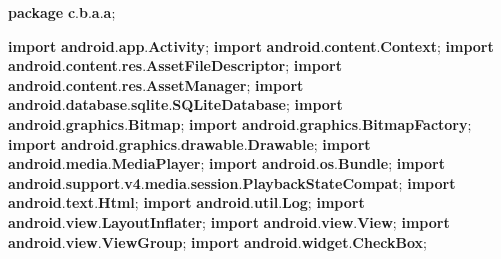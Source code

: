 \documentclass[
]{article}
\newenvironment{Shaded}{}{}
\newcommand{\ImportTok}[1]{\textcolor[rgb]{0.00,0.50,0.00}{\textbf{#1}}}
\newcommand{\KeywordTok}[1]{\textcolor[rgb]{0.00,0.44,0.13}{\textbf{#1}}}
\newcommand{\OperatorTok}[1]{\textcolor[rgb]{0.40,0.40,0.40}{#1}}
\begin{document}
\begin{Shaded}
\begin{Highlighting}[]
\KeywordTok{package}\ImportTok{ c}\OperatorTok{.}\ImportTok{b}\OperatorTok{.}\ImportTok{a}\OperatorTok{.}\ImportTok{a}\OperatorTok{;}

\KeywordTok{import} \ImportTok{android}\OperatorTok{.}\ImportTok{app}\OperatorTok{.}\ImportTok{Activity}\OperatorTok{;}
\KeywordTok{import} \ImportTok{android}\OperatorTok{.}\ImportTok{content}\OperatorTok{.}\ImportTok{Context}\OperatorTok{;}
\KeywordTok{import} \ImportTok{android}\OperatorTok{.}\ImportTok{content}\OperatorTok{.}\ImportTok{res}\OperatorTok{.}\ImportTok{AssetFileDescriptor}\OperatorTok{;}
\KeywordTok{import} \ImportTok{android}\OperatorTok{.}\ImportTok{content}\OperatorTok{.}\ImportTok{res}\OperatorTok{.}\ImportTok{AssetManager}\OperatorTok{;}
\KeywordTok{import} \ImportTok{android}\OperatorTok{.}\ImportTok{database}\OperatorTok{.}\ImportTok{sqlite}\OperatorTok{.}\ImportTok{SQLiteDatabase}\OperatorTok{;}
\KeywordTok{import} \ImportTok{android}\OperatorTok{.}\ImportTok{graphics}\OperatorTok{.}\ImportTok{Bitmap}\OperatorTok{;}
\KeywordTok{import} \ImportTok{android}\OperatorTok{.}\ImportTok{graphics}\OperatorTok{.}\ImportTok{BitmapFactory}\OperatorTok{;}
\KeywordTok{import} \ImportTok{android}\OperatorTok{.}\ImportTok{graphics}\OperatorTok{.}\ImportTok{drawable}\OperatorTok{.}\ImportTok{Drawable}\OperatorTok{;}
\KeywordTok{import} \ImportTok{android}\OperatorTok{.}\ImportTok{media}\OperatorTok{.}\ImportTok{MediaPlayer}\OperatorTok{;}
\KeywordTok{import} \ImportTok{android}\OperatorTok{.}\ImportTok{os}\OperatorTok{.}\ImportTok{Bundle}\OperatorTok{;}
\KeywordTok{import} \ImportTok{android}\OperatorTok{.}\ImportTok{support}\OperatorTok{.}\ImportTok{v4}\OperatorTok{.}\ImportTok{media}\OperatorTok{.}\ImportTok{session}\OperatorTok{.}\ImportTok{PlaybackStateCompat}\OperatorTok{;}
\KeywordTok{import} \ImportTok{android}\OperatorTok{.}\ImportTok{text}\OperatorTok{.}\ImportTok{Html}\OperatorTok{;}
\KeywordTok{import} \ImportTok{android}\OperatorTok{.}\ImportTok{util}\OperatorTok{.}\ImportTok{Log}\OperatorTok{;}
\KeywordTok{import} \ImportTok{android}\OperatorTok{.}\ImportTok{view}\OperatorTok{.}\ImportTok{LayoutInflater}\OperatorTok{;}
\KeywordTok{import} \ImportTok{android}\OperatorTok{.}\ImportTok{view}\OperatorTok{.}\ImportTok{View}\OperatorTok{;}
\KeywordTok{import} \ImportTok{android}\OperatorTok{.}\ImportTok{view}\OperatorTok{.}\ImportTok{ViewGroup}\OperatorTok{;}
\KeywordTok{import} \ImportTok{android}\OperatorTok{.}\ImportTok{widget}\OperatorTok{.}\ImportTok{CheckBox}\OperatorTok{;}

\end{Highlighting}
\end{Shaded}
\end{document}
